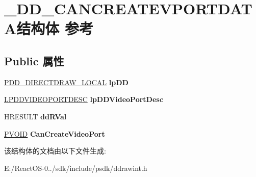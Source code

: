 \hypertarget{struct___d_d___c_a_n_c_r_e_a_t_e_v_p_o_r_t_d_a_t_a}{}\section{\+\_\+\+D\+D\+\_\+\+C\+A\+N\+C\+R\+E\+A\+T\+E\+V\+P\+O\+R\+T\+D\+A\+T\+A结构体 参考}
\label{struct___d_d___c_a_n_c_r_e_a_t_e_v_p_o_r_t_d_a_t_a}
\subsection*{Public 属性}
\begin{DoxyCompactItemize}
\item 
\mbox{\label{struct___d_d___c_a_n_c_r_e_a_t_e_v_p_o_r_t_d_a_t_a_a9713c32b244c8757ba73fc18048eead0}} 
\hyperlink{struct___d_d___d_i_r_e_c_t_d_r_a_w___l_o_c_a_l}{P\+D\+D\+\_\+\+D\+I\+R\+E\+C\+T\+D\+R\+A\+W\+\_\+\+L\+O\+C\+AL} {\bfseries lp\+DD}
\item 
\mbox{\label{struct___d_d___c_a_n_c_r_e_a_t_e_v_p_o_r_t_d_a_t_a_ad03f7c69bc1c07bcf02aafd06a07489a}} 
\hyperlink{struct___d_d_v_i_d_e_o_p_o_r_t_d_e_s_c}{L\+P\+D\+D\+V\+I\+D\+E\+O\+P\+O\+R\+T\+D\+E\+SC} {\bfseries lp\+D\+D\+Video\+Port\+Desc}
\item 
\mbox{\label{struct___d_d___c_a_n_c_r_e_a_t_e_v_p_o_r_t_d_a_t_a_a81634ac4a61f41d66cd00977ef5a1377}} 
H\+R\+E\+S\+U\+LT {\bfseries dd\+R\+Val}
\item 
\mbox{\label{struct___d_d___c_a_n_c_r_e_a_t_e_v_p_o_r_t_d_a_t_a_ae89e8e63412325c151e06c23ed39321d}} 
\hyperlink{interfacevoid}{P\+V\+O\+ID} {\bfseries Can\+Create\+Video\+Port}
\end{DoxyCompactItemize}


该结构体的文档由以下文件生成\+:\begin{DoxyCompactItemize}
\item 
E\+:/\+React\+O\+S-\/0../sdk/include/psdk/ddrawint.\+h\end{DoxyCompactItemize}
